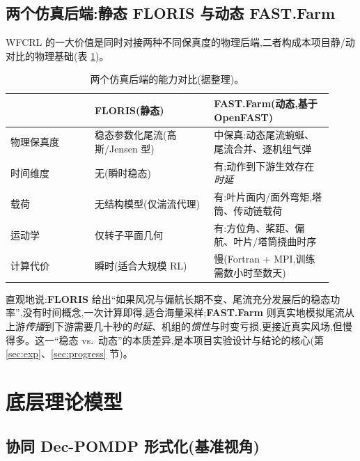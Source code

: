 \documentclass[12pt,a4paper]{article}
\theoremstyle{definition}
\theoremstyle{plain}
\begin{document}
\subsection{两个仿真后端:静态 FLORIS 与动态 FAST.Farm}

WFCRL 的一大价值是同时对接两种不同保真度的物理后端,二者构成本项目静/动对比的物理基础(表 \ref{tab:sim})。

\begin{table}[h]
\centering
\renewcommand{\arraystretch}{1.25}
\begin{tabular}{@{}p{0.24\linewidth} p{0.34\linewidth} p{0.34\linewidth}@{}}
\toprule
 & \textbf{FLORIS(静态)} & \textbf{FAST.Farm(动态,基于 OpenFAST)} \\
\midrule
物理保真度 & 稳态参数化尾流(高斯/Jensen 型) & 中保真:动态尾流蜿蜒、尾流合并、逐机组气弹 \\
时间维度 & 无(瞬时稳态) & 有;动作到下游生效存在\emph{时延} \\
载荷 & 无结构模型(仅湍流代理) & 有:叶片面内/面外弯矩,塔筒、传动链载荷 \\
运动学 & 仅转子平面几何 & 有:方位角、桨距、偏航、叶片/塔筒挠曲时序 \\
计算代价 & 瞬时(适合大规模 RL) & 慢(Fortran + MPI,训练需数小时至数天) \\
\bottomrule
\end{tabular}
\caption{两个仿真后端的能力对比(据\cite{wfcrl}整理)。}
\label{tab:sim}
\end{table}

直观地说:\textbf{FLORIS} 给出“如果风况与偏航长期不变、尾流充分发展后的稳态功率”,没有时间概念,一次计算即得,适合海量采样;\textbf{FAST.Farm} 则真实地模拟尾流从上游\emph{传播}到下游需要几十秒的\emph{时延}、机组的\emph{惯性}与时变亏损,更接近真实风场,但慢得多。这一“稳态 vs.\ 动态”的本质差异,是本项目实验设计与结论的核心(第 \ref{sec:exp}、\ref{sec:progress} 节)。

\section{底层理论模型}
\label{sec:theory}

\subsection{协同 Dec-POMDP 形式化(基准视角)}
\end{document}
